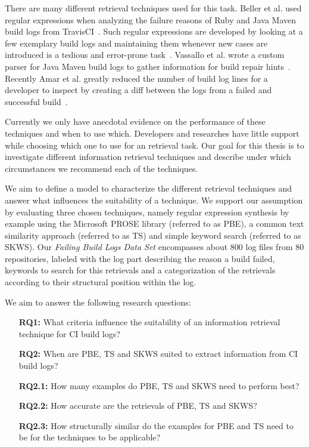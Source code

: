\documentclass[\myrootdir/main.tex]{subfiles}
\begin{document}
There are many different retrieval techniques used for this task. Beller et al. used regular expressions when analyzing the failure reasons of Ruby and Java Maven build logs from TravisCI~\cite{beller2017oops}. Such regular expressions are developed by looking at a few exemplary build logs and maintaining them whenever new cases are introduced is a tedious and error-prone task~\cite{michael2019regexes}.
Vassallo et al. wrote a custom parser for Java Maven build logs to gather information for build repair hints~\cite{vassallo2018un-break}.
Recently Amar et al. greatly reduced the number of build log lines for a developer to inspect by creating a diff between the logs from a failed and successful build~\cite{amar2019mining}.

Currently we only have anecdotal evidence on the performance of these techniques and when to use which. Developers and researches have little support while choosing which one to use for an retrieval task. Our goal for this thesis is to investigate different information retrieval techniques and describe under which circumstances we recommend each of the techniques.

We aim to define a model to characterize the different retrieval techniques and answer what influences the suitability of a technique.
We support our assumption by evaluating three chosen techniques, namely regular expression synthesis by example using the Microsoft PROSE library (referred to as PBE), a common text similarity approach (referred to as TS) and simple keyword search (referred to as SKWS).
Our \emph{Failing Build Logs Data Set} encompasses about 800 log files from 80 repositories, labeled with the log part describing the reason a build failed, keywords to search for this retrievals and a categorization of the retrievals according to their structural position within the log. 


We aim to answer the following research questions:
\begin{itemize}
  \item[\textbf{RQ1:}] What criteria influence the suitability of an information retrieval technique for CI build logs?
  \item[\textbf{RQ2:}] When are PBE, TS and SKWS suited to extract information from CI build logs?
  \item[\textbf{RQ2.1:}] How many examples do PBE, TS and SKWS need to perform best?
  \item[\textbf{RQ2.2:}] How accurate are the retrievals of PBE, TS and SKWS?
  \item[\textbf{RQ2.3:}] How structurally similar do the examples for PBE and TS need to be for the techniques to be applicable?
\end{itemize}
\end{document}
